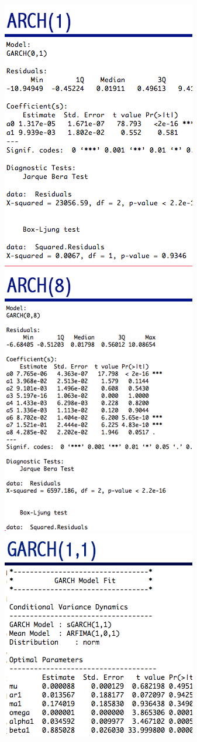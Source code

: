 \documentclass[11pt]{amsart}
\begin{document}
\includegraphics[scale=0.5]{arch1_basket_11_25.png} \\
\includegraphics[scale=0.5]{arch8_basket_12_2.png} \\
\includegraphics[scale=0.5]{garch11_basket_12_2.png} \\
\end{document}
